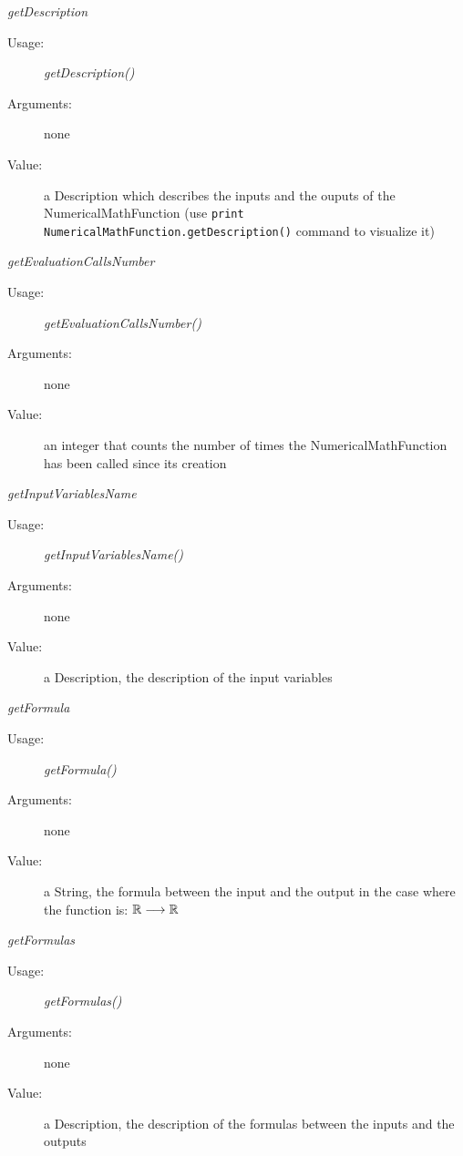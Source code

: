 \begin{description}
\begin{description}
\item \textit{getDescription}
\begin{description}
\item[Usage:] \textit{getDescription()}
\item[Arguments:] none
\item[Value:] a Description which describes the inputs and the ouputs
of the NumericalMathFunction
(use \verb|print NumericalMathFunction.getDescription()| command to
visualize it)
\end{description}
\bigskip

\item \textit{getEvaluationCallsNumber}
\begin{description}
\item[Usage:] \textit{getEvaluationCallsNumber()}
\item[Arguments:] none
\item[Value:] an integer that counts the number of times the NumericalMathFunction has been called since its creation
\end{description}
\bigskip

\item \textit{getInputVariablesName}
\begin{description}
\item[Usage:] \textit{getInputVariablesName()}
\item[Arguments:] none
\item[Value:] a Description, the description of the input variables
\end{description}
\bigskip

\item \textit{getFormula}
\begin{description}
\item[Usage:] \textit{getFormula()}
\item[Arguments:] none
\item[Value:] a String, the formula between the input and the output in the case where the function is: ${\mathbb R} \longrightarrow {\mathbb R}$
\end{description}
\bigskip

\item \textit{getFormulas}
\begin{description}
\item[Usage:] \textit{getFormulas()}
\item[Arguments:] none
\item[Value:] a Description, the description of the formulas between the inputs and the outputs
\end{description}
\bigskip


\end{description}
\end{description}

